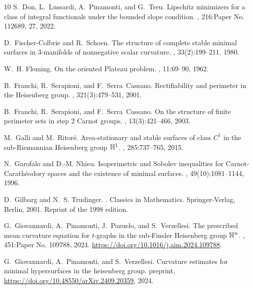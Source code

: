 \begin{thebibliography}{10}
S.~Don, L.~Lussardi, A.~Pinamonti, and G.~Treu.
\newblock Lipschitz minimizers for a class of integral functionals under the bounded slope condition.
, 216:Paper No. 112689, 27, 2022.

D.~Fischer-Colbrie and R.~Schoen.
\newblock The structure of complete stable minimal surfaces in {$3$}-manifolds of nonnegative scalar curvature.
, 33(2):199--211, 1980.

W.~H. Fleming.
\newblock On the oriented {P}lateau problem.
, 11:69--90, 1962.

B.~Franchi, R.~Serapioni, and F.~Serra~Cassano.
\newblock Rectifiability and perimeter in the {H}eisenberg group.
, 321(3):479--531, 2001.

B.~Franchi, R.~Serapioni, and F.~Serra~Cassano.
\newblock On the structure of finite perimeter sets in step 2 {C}arnot groups.
, 13(3):421--466, 2003.

M.~Galli and M.~Ritor\'{e}.
\newblock Area-stationary and stable surfaces of class {$C^1$} in the sub-{R}iemannian {H}eisenberg group {$\Bbb{H}^1$}.
, 285:737--765, 2015.

N.~Garofalo and D.-M. Nhieu.
\newblock Isoperimetric and {S}obolev inequalities for {C}arnot-{C}arath\'{e}odory spaces and the existence of minimal surfaces.
, 49(10):1081--1144, 1996.

D.~Gilbarg and N.~S. Trudinger.
.
\newblock Classics in Mathematics. Springer-Verlag, Berlin, 2001.
\newblock Reprint of the 1998 edition.

G.~Giovannardi, A.~Pinamonti, J.~Pozuelo, and S.~Verzellesi.
\newblock The prescribed mean curvature equation for {$t$}-graphs in the sub-{F}insler {H}eisenberg group {$\Bbb{H}^n$}.
, 451:Paper No. 109788, 2024.
\newblock \url{https://doi.org/10.1016/j.aim.2024.109788}.

G.~Giovannardi, A.~Pinamonti, and S.~Verzellesi.
\newblock Curvature estimates for minimal hypersurfaces in the heisenberg group.
\newblock preprint, \url{https://doi.org/10.48550/arXiv.2409.20359}, 2024.


\end{thebibliography}
